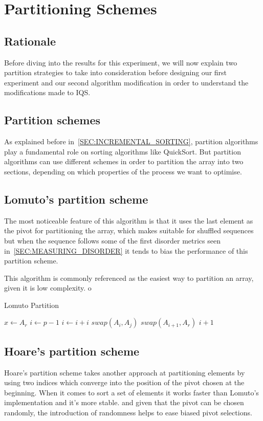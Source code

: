 \section{Partitioning Schemes}
\label{SECTION:PARTITIONING_SCHEMES}
\subsection{Rationale}
Before diving into the results for this experiment, we will now explain two partition strategies to take into consideration before designing our first experiment and our second algorithm modification in order to understand the modifications made to IQS.

\subsection{Partition schemes}
As explained before in~\ref{SEC:INCREMENTAL_SORTING}, partition algorithms play a fundamental role on sorting algorithms like QuickSort. But partition algorithms can use different schemes in order to partition the array into two sections, depending on which properties of the process we want to optimise.

\subsection{Lomuto's partition scheme}

The most noticeable feature of this algorithm is that it uses the last element as the pivot for partitioning the array, which makes suitable for shuffled sequences but when the sequence follows some of the first disorder metrics seen in~\ref{SEC:MEASURING_DISORDER} it tends to bias the performance of this partition scheme.

This algorithm is commonly referenced as the easiest way to partition an array, given it is low complexity.
o
\begin{algorithm}
\caption{Lomuto Partition}\label{ALG:LOMUTO_PARTITION}
\begin{algorithmic}[1]
    \State $x \gets A_r$
    \State $i \gets p-1$
        \State $i \gets i + i$
        \State $swap(A_i, A_j)$
    \EndIf
    \EndFor
    \State $swap(A_{i+1}, A_r)$
    \State \Return $i + 1$
    \EndProcedure
\end{algorithmic}
\end{algorithm}

\subsection{Hoare's partition scheme}
Hoare's partition scheme takes another approach at partitioning elements by using two indices which converge into the position of the pivot chosen at the beginning. When it comes to sort a set of elements it works faster than Lomuto's implementation and it's more stable. and given that the pivot can be chosen randomly, the introduction of randomness helps to ease biased pivot selections.

